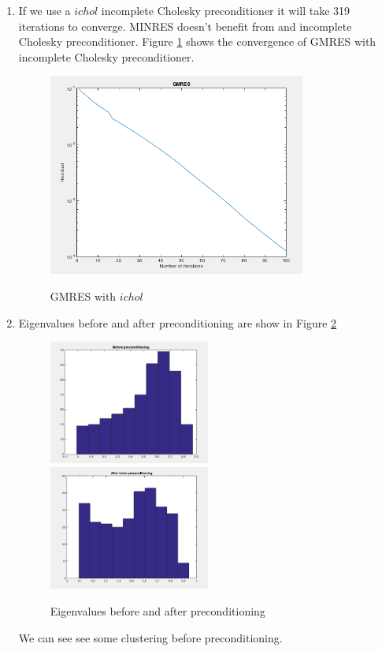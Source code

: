 \documentclass{article}
\begin{document}
\begin{enumerate}
\item 

If we use a $ichol$ incomplete Cholesky preconditioner it will take 319 iterations to converge. MINRES doesn't benefit from and incomplete Cholesky preconditioner.  Figure \ref{fig:problem1_2} shows the convergence of GMRES with incomplete Cholesky preconditioner. \\

\begin{figure} [h!]
\includegraphics[width=0.8\textwidth]{GMRES_ICHOL} 
\label{fig:problem1_2}
\caption{GMRES with $ichol$} 
\end{figure}

\item 
Eigenvalues before and after preconditioning are show in Figure \ref{fig:eig}

\begin{figure}[h!]
\includegraphics[width=0.5\textwidth]{before}
\includegraphics[width=0.5\textwidth]{after}
\label{fig:eig}
\caption{Eigenvalues before and after preconditioning}
\end{figure}

We can see see some clustering before preconditioning. 

\end{enumerate}
\end{document}
